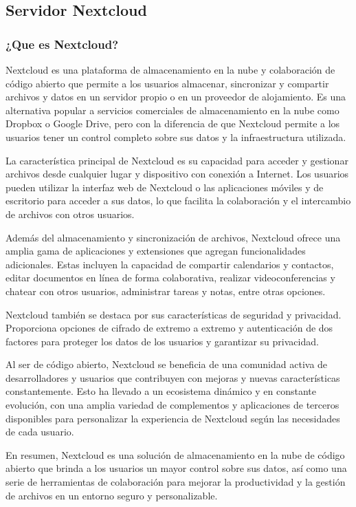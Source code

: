 			\subsection{Servidor Nextcloud}
			
			\subsubsection{¿Que es Nextcloud?}
			
			Nextcloud es una plataforma de almacenamiento en la nube y colaboración de código abierto que permite a los usuarios almacenar, sincronizar y compartir archivos y datos en un servidor propio o en un proveedor de alojamiento. Es una alternativa popular a servicios comerciales de almacenamiento en la nube como Dropbox o Google Drive, pero con la diferencia de que Nextcloud permite a los usuarios tener un control completo sobre sus datos y la infraestructura utilizada.
			
			La característica principal de Nextcloud es su capacidad para acceder y gestionar archivos desde cualquier lugar y dispositivo con conexión a Internet. Los usuarios pueden utilizar la interfaz web de Nextcloud o las aplicaciones móviles y de escritorio para acceder a sus datos, lo que facilita la colaboración y el intercambio de archivos con otros usuarios.
			
			Además del almacenamiento y sincronización de archivos, Nextcloud ofrece una amplia gama de aplicaciones y extensiones que agregan funcionalidades adicionales. Estas incluyen la capacidad de compartir calendarios y contactos, editar documentos en línea de forma colaborativa, realizar videoconferencias y chatear con otros usuarios, administrar tareas y notas, entre otras opciones.
			
			Nextcloud también se destaca por sus características de seguridad y privacidad. Proporciona opciones de cifrado de extremo a extremo y autenticación de dos factores para proteger los datos de los usuarios y garantizar su privacidad.
			
			Al ser de código abierto, Nextcloud se beneficia de una comunidad activa de desarrolladores y usuarios que contribuyen con mejoras y nuevas características constantemente. Esto ha llevado a un ecosistema dinámico y en constante evolución, con una amplia variedad de complementos y aplicaciones de terceros disponibles para personalizar la experiencia de Nextcloud según las necesidades de cada usuario.
			
			En resumen, Nextcloud es una solución de almacenamiento en la nube de código abierto que brinda a los usuarios un mayor control sobre sus datos, así como una serie de herramientas de colaboración para mejorar la productividad y la gestión de archivos en un entorno seguro y personalizable.
			

